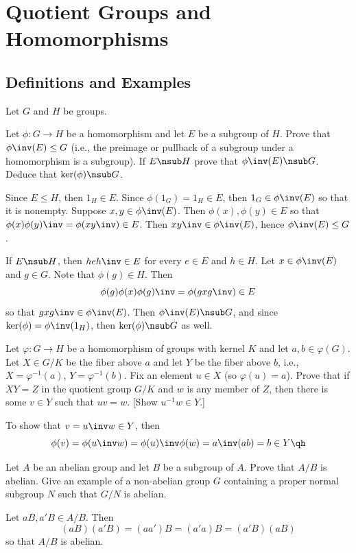 \section{Quotient Groups and Homomorphisms}

\subsection{Definitions and Examples}

Let $G$ and $H$ be groups.

\begin{problems}
    \item Let $\phi : G \to H$ be a homomorphism and let $E$ be a subgroup of $H$. Prove that $\phi\inv(E) \leq G$ (i.e., the preimage or pullback of a subgroup under a homomorphism is a subgroup). If $E \nsub H$ prove that $\phi\inv(E) \nsub G$. Deduce that $\ker(\phi) \nsub G$.
    \begin{sol}
        Since $E \leq H$, then $1_H \in E$. Since $\phi(1_G) = 1_H \in E$, then $1_G \in \phi\inv(E)$ so that it is nonempty. Suppose $x, y \in \phi\inv(E)$. Then $\phi(x), \phi(y) \in E$ so that $\phi(x)\phi(y)\inv = \phi(xy\inv) \in E$. Then $xy\inv \in \phi\inv(E)$, hence $\phi\inv(E) \leq G$.
        
        If $E \nsub H$, then $heh\inv \in E$ for every $e \in E$ and $h \in H$. Let $x \in \phi\inv(E)$ and $g \in G$. Note that $\phi(g) \in H$. Then
        \[\phi(g)\phi(x)\phi(g)\inv = \phi(gxg\inv) \in E\]
        so that $gxg\inv \in \phi\inv(E)$. Then $\phi\inv(E) \nsub G$, and since $\ker(\phi) = \phi\inv(1_H)$, then $\ker(\phi) \nsub G$ as well.
    \end{sol}
    \item Let $\varphi : G \to H$ be a homomorphism of groups with kernel $K$ and let $a,b \in \varphi(G)$. Let $X \in G/K$ be the fiber above $a$ and let $Y$ be the fiber above $b$, i.e.,
    $X = \varphi^{-1}(a)$, $Y = \varphi^{-1}(b)$. Fix an element $u \in X$ (so $\varphi(u)=a$). Prove that if $XY = Z$ in the quotient group $G/K$ and $w$ is any member of $Z$, then there is some $v \in Y$ such that $uv = w$. [Show $u^{-1}w \in Y$.]
    \begin{sol}
        To show that $v = u\inv w \in Y$, then
        \[\phi(v) = \phi(u\inv w) = \phi(u)\inv \phi(w) = a\inv (ab) = b \in Y \qh\]
    \end{sol}
    \item Let $A$ be an abelian group and let $B$ be a subgroup of $A$.
    Prove that $A/B$ is abelian. Give an example of a non-abelian group $G$ containing a proper normal subgroup $N$ such that $G/N$ is abelian.
    \begin{sol}
        Let $aB, a'B \in A/B$. Then
        \[(aB)(a'B) = (aa')B = (a'a)B = (a'B)(aB)\]
        so that $A/B$ is abelian.


\end{sol}
\end{problems}
